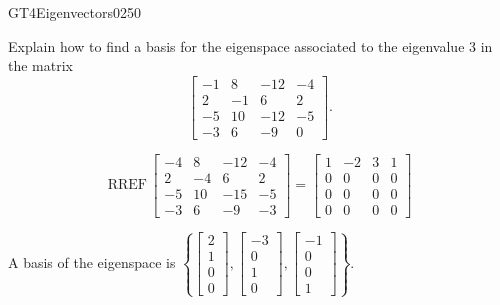 \begin{exercise}{GT4}{Eigenvectors}{0250} 
\begin{exerciseStatement} 

Explain how to find a basis for the eigenspace associated to the eigenvalue \(3\) in the matrix \[\left[\begin{array}{cccc}
-1 & 8 & -12 & -4 \\
2 & -1 & 6 & 2 \\
-5 & 10 & -12 & -5 \\
-3 & 6 & -9 & 0
\end{array}\right].\]

 \end{exerciseStatement}
 \begin{exerciseAnswer} 

\[\mathrm{RREF}\,\left[\begin{array}{cccc}
-4 & 8 & -12 & -4 \\
2 & -4 & 6 & 2 \\
-5 & 10 & -15 & -5 \\
-3 & 6 & -9 & -3
\end{array}\right]=\left[\begin{array}{cccc}
1 & -2 & 3 & 1 \\
0 & 0 & 0 & 0 \\
0 & 0 & 0 & 0 \\
0 & 0 & 0 & 0
\end{array}\right]\]

 

A basis of the eigenspace is \(\left\{ \left[\begin{array}{c}
2 \\
1 \\
0 \\
0
\end{array}\right] , \left[\begin{array}{c}
-3 \\
0 \\
1 \\
0
\end{array}\right] , \left[\begin{array}{c}
-1 \\
0 \\
0 \\
1
\end{array}\right] \right\}\).

 \end{exerciseAnswer}
 \end{exercise}


\newpage




